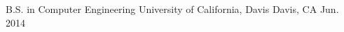 

\begin{cventries}

  \cventry
    {B.S. in Computer Engineering} %
    {University of California, Davis} %
    {Davis, CA} %
    {Jun. 2014} %
    {} %
    {}

\end{cventries}
